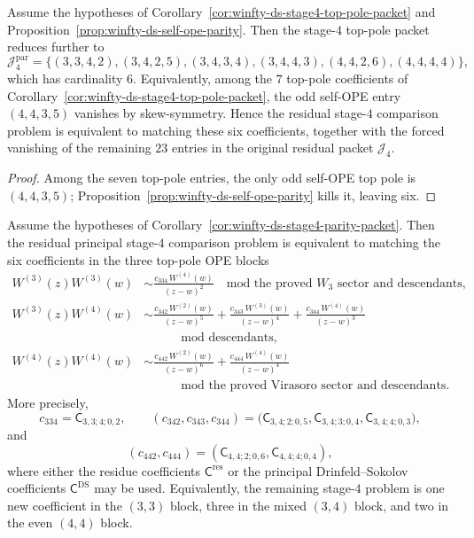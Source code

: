 \begin{corollary}
\label{cor:winfty-ds-stage4-parity-packet}
Assume the hypotheses of
Corollary~\ref{cor:winfty-ds-stage4-top-pole-packet} and
Proposition~\ref{prop:winfty-ds-self-ope-parity}. Then the stage-$4$
top-pole packet reduces further to
\[
\mathcal{J}_4^{\mathrm{par}}
=\{(3,3,4,2),(3,4,2,5),(3,4,3,4),(3,4,4,3),
(4,4,2,6),(4,4,4,4)\},
\]
which has cardinality $6$. Equivalently, among the $7$ top-pole
coefficients of
Corollary~\ref{cor:winfty-ds-stage4-top-pole-packet}, the odd self-OPE
entry $(4,4,3,5)$ vanishes by skew-symmetry. Hence the residual
stage-$4$ comparison problem is equivalent to matching these six
coefficients, together with the forced vanishing of the remaining $23$
entries in the original residual packet $\mathcal{J}_4$.
\end{corollary}

\begin{proof}
Among the seven top-pole entries, the only odd self-OPE top pole is $(4,4,3,5)$; Proposition~\ref{prop:winfty-ds-self-ope-parity} kills it, leaving six.
\end{proof}

\begin{corollary}
\label{cor:winfty-ds-stage4-ope-blocks}
Assume the hypotheses of
Corollary~\ref{cor:winfty-ds-stage4-parity-packet}. Then the residual
principal stage-$4$ comparison problem is equivalent to matching the
six coefficients in the three top-pole OPE blocks
\begin{align*}
W^{(3)}(z)W^{(3)}(w)
&\sim
\frac{c_{334}\,W^{(4)}(w)}{(z-w)^2}
\quad\text{mod the proved $W_3$ sector and descendants},\\
W^{(3)}(z)W^{(4)}(w)
&\sim
\frac{c_{342}\,W^{(2)}(w)}{(z-w)^5}
+\frac{c_{343}\,W^{(3)}(w)}{(z-w)^4}
+\frac{c_{344}\,W^{(4)}(w)}{(z-w)^3}\\
&\qquad
\quad\text{mod descendants},\\
W^{(4)}(z)W^{(4)}(w)
&\sim
\frac{c_{442}\,W^{(2)}(w)}{(z-w)^6}
+\frac{c_{444}\,W^{(4)}(w)}{(z-w)^4}\\
&\qquad
\quad\text{mod the proved Virasoro sector and descendants}.
\end{align*}
More precisely,
\[
c_{334}=\mathsf{C}_{3,3;4;0,2},
\qquad
(c_{342},c_{343},c_{344})
\!=\!
\bigl(
\mathsf{C}_{3,4;2;0,5},
\mathsf{C}_{3,4;3;0,4},
\mathsf{C}_{3,4;4;0,3}
\bigr),
\]
and
\[
(c_{442},c_{444})
=(\mathsf{C}_{4,4;2;0,6},\mathsf{C}_{4,4;4;0,4}),
\]
where either the residue coefficients
$\mathsf{C}^{\mathrm{res}}$ or the principal Drinfeld--Sokolov
coefficients $\mathsf{C}^{\mathrm{DS}}$ may be used. Equivalently, the
remaining stage-$4$ problem is one new coefficient in the $(3,3)$ block,
three in the mixed $(3,4)$ block, and two in the even $(4,4)$ block.
\end{corollary}

